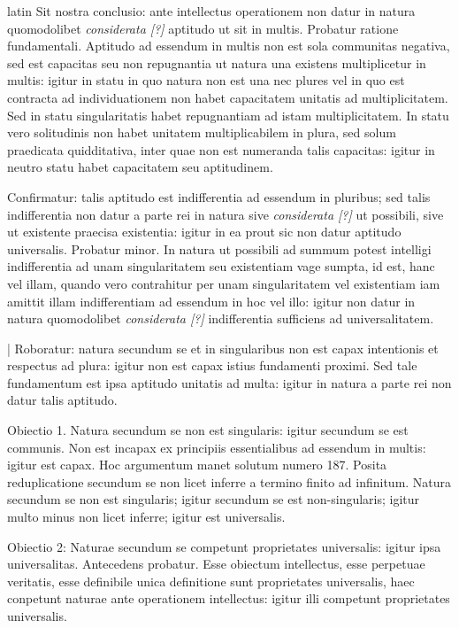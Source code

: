 \begin{otherlanguage*}{latin}
\pstart
  Sit nostra conclusio: ante intellectus operationem non datur in natura quomodolibet \emph{considerata [?]} aptitudo ut sit in multis. Probatur ratione fundamentali. Aptitudo ad essendum in multis non est sola communitas negativa, sed est capacitas seu non repugnantia ut natura una existens multiplicetur in multis: igitur in statu in quo natura non est una nec plures vel in quo est contracta ad individuationem non habet capacitatem unitatis ad multiplicitatem. Sed in statu singularitatis habet repugnantiam ad istam multiplicitatem. In statu vero solitudinis non habet unitatem multiplicabilem in plura, sed solum praedicata quidditativa, inter quae non est numeranda talis capacitas: igitur in neutro statu habet capacitatem seu aptitudinem. 
\pend

\pstart
  Confirmatur: talis aptitudo est indifferentia ad essendum in pluribus; sed talis indifferentia non datur a parte rei in natura sive \emph{considerata [?]} ut possibili, sive ut existente praecisa existentia: igitur in ea prout sic non datur aptitudo universalis. Probatur minor. In natura ut possibili ad summum potest intelligi indifferentia ad unam singularitatem seu existentiam vage sumpta, id est, hanc vel illam, quando vero contrahitur per unam singularitatem vel existentiam iam amittit illam indifferentiam ad essendum in hoc vel illo: igitur non datur in natura quomodolibet \emph{considerata [?]} indifferentia sufficiens ad universalitatem. 
\pend

\pstart
  \textnormal{|} Roboratur: natura secundum se et in singularibus non est capax intentionis et respectus ad plura: igitur non est capax istius fundamenti proximi. Sed tale fundamentum est ipsa aptitudo unitatis ad multa: igitur in natura a parte rei non datur talis aptitudo. 
\pend

\pstart
  Obiectio 1. Natura secundum se non est singularis: igitur secundum se est communis. Non est incapax ex principiis essentialibus ad essendum in multis: igitur est capax. Hoc argumentum manet solutum numero 187. Posita reduplicatione secundum se non licet inferre a termino finito ad infinitum. Natura secundum se non est singularis; igitur secundum se est non-singularis; igitur multo minus non licet inferre; igitur est universalis. 
\pend

\pstart
  Obiectio 2: Naturae secundum se competunt proprietates universalis: igitur ipsa universalitas. Antecedens probatur. Esse obiectum intellectus, esse perpetuae veritatis, esse definibile unica definitione sunt proprietates universalis, haec conpetunt naturae ante operationem intellectus: igitur illi competunt proprietates universalis. 
\pend


\end{otherlanguage*}

